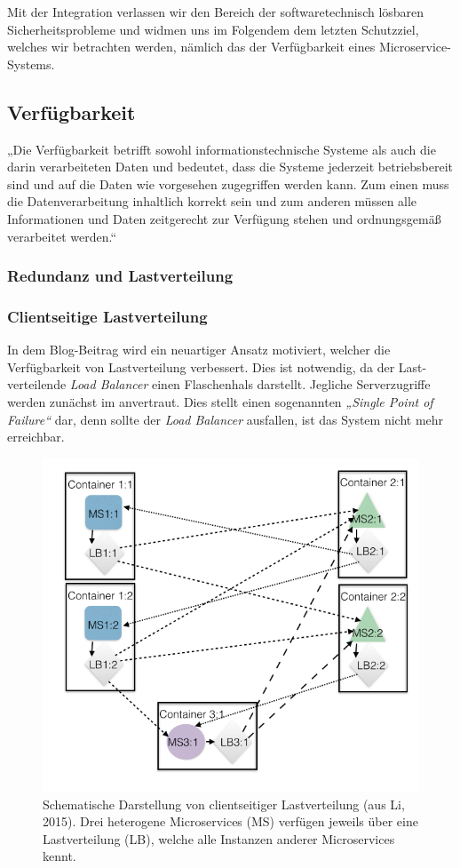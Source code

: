 Mit der Integration verlassen wir den Bereich der softwaretechnisch lösbaren Sicherheitsprobleme und widmen uns im Folgendem dem letzten Schutzziel, welches wir betrachten werden, nämlich das der Verfügbarkeit eines Microservice-Systems.

\subsection{Verfügbarkeit}
\label{subsec:verfügbarkeit}
„Die Verfügbarkeit betrifft sowohl informationstechnische Systeme als auch die darin verarbeiteten Daten und bedeutet, dass die Systeme jederzeit betriebsbereit sind und auf die Daten wie vorgesehen zugegriffen werden kann. Zum einen muss die Datenverarbeitung inhaltlich korrekt sein und zum anderen müssen alle Informationen und Daten zeitgerecht zur Verfügung stehen und ordnungsgemäß verarbeitet werden.“ \cite{Bedner+10}

\subsubsection{Redundanz und Lastverteilung}

\subsubsection{Clientseitige Lastverteilung}

In dem Blog-Beitrag \cite{Li15} wird ein neuartiger Ansatz motiviert, welcher die Verfügbarkeit von Lastverteilung verbessert. Dies ist notwendig, da der Last-verteilende \textit{Load Balancer} einen Flaschenhals darstellt. Jegliche Serverzugriffe werden zunächst im anvertraut. Dies stellt einen sogenannten \textit{„Single Point of Failure“} dar, denn sollte der \textit{Load Balancer} ausfallen, ist das System nicht mehr erreichbar.

\begin{figure}
	\centering
	\includegraphics[width=.55\linewidth]{img/clientloadbal}
	\caption{Schematische Darstellung von clientseitiger Lastverteilung (aus Li, 2015). Drei heterogene Microservices (MS) verfügen jeweils über eine Lastverteilung (LB), welche alle Instanzen anderer Microservices kennt.}
	\label{fig:clientseitige_lastverteilung}
\end{figure}

